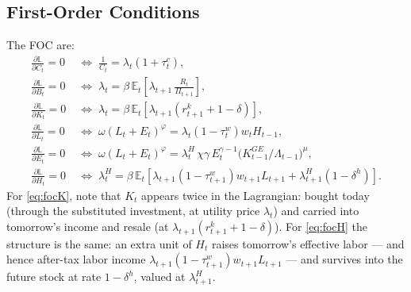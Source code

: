 \documentclass[11pt]{article}
\begin{document}
\subsection{First-Order Conditions}

The FOC are:
\begin{align}
    \frac{\partial\mathbb{L}}{\partial C_t} = 0
    &\;\Leftrightarrow\;
    \frac{1}{C_t} = \lambda_t \left(1+\tau_t^{c}\right), \label{eq:focC}\\
    \frac{\partial\mathbb{L}}{\partial B_t} = 0
    &\;\Leftrightarrow\;
    \lambda_t = \beta\,\mathbb{E}_t\!\left[\lambda_{t+1}\,
    \frac{R_t}{\Pi_{t+1}}\right], \label{eq:focB}\\
    \frac{\partial\mathbb{L}}{\partial K_t} = 0
    &\;\Leftrightarrow\;
    \lambda_t = \beta\,\mathbb{E}_t\!\left[\lambda_{t+1}
    \left(r_{t+1}^{k} + 1 - \delta\right)\right], \label{eq:focK}\\
    \frac{\partial\mathbb{L}}{\partial L_t} = 0
    &\;\Leftrightarrow\;
    \omega\left(L_t + E_t\right)^{\varphi}
    = \lambda_t \left(1-\tau_t^{w}\right) w_t H_{t-1}, \label{eq:focL}\\
    \frac{\partial\mathbb{L}}{\partial E_t} = 0
    &\;\Leftrightarrow\;
    \omega\left(L_t + E_t\right)^{\varphi}
    = \lambda_t^{H}\, \chi\gamma\, E_t^{\gamma-1}
    \big(K_{t-1}^{GE}/\Lambda_{t-1}\big)^{\mu}, \label{eq:focE}\\
    \frac{\partial\mathbb{L}}{\partial H_t} = 0
    &\;\Leftrightarrow\;
    \lambda_t^{H} = \beta\,\mathbb{E}_t\!\left[\lambda_{t+1}
    \left(1-\tau_{t+1}^{w}\right) w_{t+1} L_{t+1}
    + \lambda_{t+1}^{H}\left(1-\delta^{h}\right)\right]. \label{eq:focH}
\end{align}
For \eqref{eq:focK}, note that $K_t$ appears twice in the Lagrangian: bought today
(through the substituted investment, at utility price $\lambda_t$) and carried
into tomorrow's income and resale (at $\lambda_{t+1}(r^k_{t+1}+1-\delta)$). For
\eqref{eq:focH} the structure is the same: an extra unit of $H_t$ raises
tomorrow's effective labor --- and hence after-tax labor income
$\lambda_{t+1}(1-\tau^w_{t+1})w_{t+1}L_{t+1}$ --- and survives into the future
stock at rate $1-\delta^{h}$, valued at $\lambda^{H}_{t+1}$.
\end{document}
